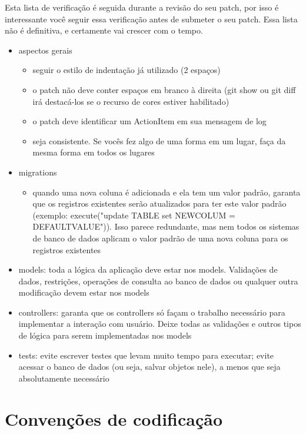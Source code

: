 \documentclass[11pt]{article}
\begin{document}
Esta lista de verificação é seguida durante a revisão do seu patch, por isso é
interessante você seguir essa verificação antes de submeter o seu patch. Essa
lista não é definitiva, e certamente vai crescer com o tempo.

\begin{itemize}
  \item aspectos gerais
  \begin{itemize}
    \item seguir o estilo de indentação já utilizado (2 espaços)
    \item o patch não deve conter espaços em branco à direita (git show ou git
      diff irá destacá-los se o recurso de cores estiver habilitado)
    \item o patch deve identificar um ActionItem em sua mensagem de log
    \item seja consistente. Se vocês fez algo de uma forma em um lugar, faça
      da mesma forma em todos os lugares
  \end{itemize}
  \item migrations
  \begin{itemize}
    \item quando uma nova coluna é adicionada e ela tem um valor padrão,
      garanta que os registros existentes serão atualizados para ter este
      valor padrão (exemplo: execute("update TABLE set NEWCOLUM =
      DEFAULTVALUE")). Isso parece redundante, mas nem todos os sistemas de
      banco de dados aplicam o valor padrão de uma nova coluna para os
      registros existentes
  \end{itemize}
  \item models: toda a lógica da aplicação deve estar nos models. Validações
    de dados, restrições, operações de consulta ao banco de dados ou qualquer
    outra modificação devem estar nos models
  \item controllers: garanta que os controllers só façam o trabalho necessário
    para implementar a interação com usuário. Deixe todas as validações e
    outros tipos de lógica para serem implementadas nos models
  \item tests: evite escrever testes que levam muito tempo para executar;
    evite acessar o banco de dados (ou seja, salvar objetos nele), a menos que
    seja absolutamente necessário
\end{itemize}

\section{Convenções de codificação}
\end{document}
